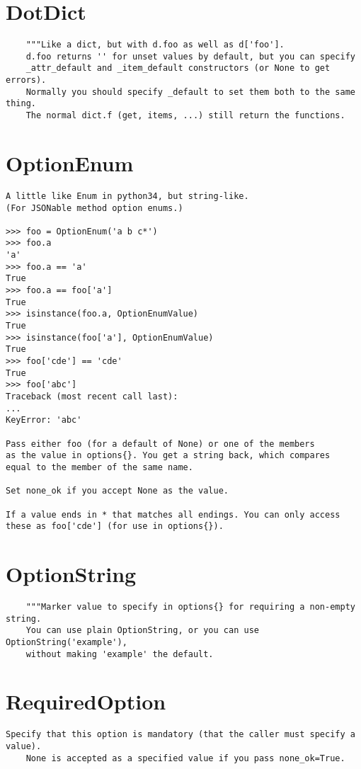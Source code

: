 \section{DotDict}
\begin{verbatim}
    """Like a dict, but with d.foo as well as d['foo'].
    d.foo returns '' for unset values by default, but you can specify
    _attr_default and _item_default constructors (or None to get errors).
    Normally you should specify _default to set them both to the same thing.
    The normal dict.f (get, items, ...) still return the functions.
\end{verbatim}




\section{OptionEnum}
\begin{verbatim}
A little like Enum in python34, but string-like.
(For JSONable method option enums.)

>>> foo = OptionEnum('a b c*')
>>> foo.a
'a'
>>> foo.a == 'a'
True
>>> foo.a == foo['a']
True
>>> isinstance(foo.a, OptionEnumValue)
True
>>> isinstance(foo['a'], OptionEnumValue)
True
>>> foo['cde'] == 'cde'
True
>>> foo['abc']
Traceback (most recent call last):
...
KeyError: 'abc'

Pass either foo (for a default of None) or one of the members
as the value in options{}. You get a string back, which compares
equal to the member of the same name.

Set none_ok if you accept None as the value.

If a value ends in * that matches all endings. You can only access
these as foo['cde'] (for use in options{}).
\end{verbatim}



\section{OptionString}
\begin{verbatim}
    """Marker value to specify in options{} for requiring a non-empty string.
    You can use plain OptionString, or you can use OptionString('example'),
    without making 'example' the default.
\end{verbatim}



\section{RequiredOption}
\begin{verbatim}
Specify that this option is mandatory (that the caller must specify a value).
    None is accepted as a specified value if you pass none_ok=True.
\end{verbatim}



